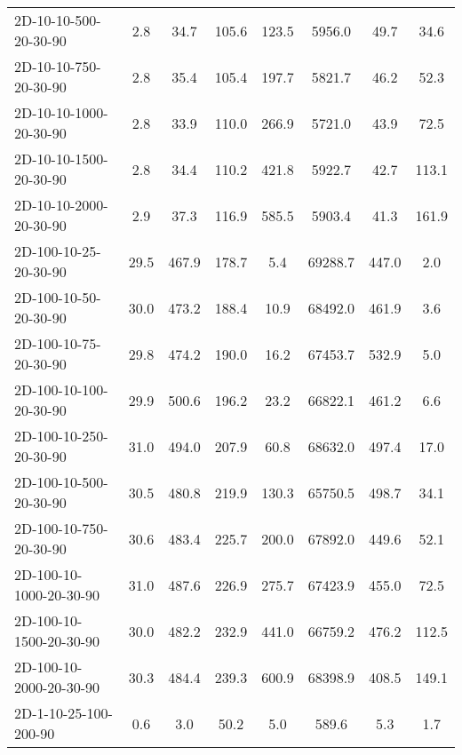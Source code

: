 \documentclass{article}
\begin{document}
\begin{table}[h]
\begin{center}
\begin{tabular}{|l||c|c|c|c|c|c|c|}
            2D-10-10-500-20-30-90         & 2.8  & 34.7      & 105.6      & 123.5       & 5956.0   & 49.7      & 34.6       \\
            2D-10-10-750-20-30-90         & 2.8  & 35.4      & 105.4      & 197.7       & 5821.7   & 46.2      & 52.3       \\
            2D-10-10-1000-20-30-90        & 2.8  & 33.9      & 110.0      & 266.9       & 5721.0   & 43.9      & 72.5       \\
            2D-10-10-1500-20-30-90        & 2.8  & 34.4      & 110.2      & 421.8       & 5922.7   & 42.7      & 113.1      \\
            2D-10-10-2000-20-30-90        & 2.9  & 37.3      & 116.9      & 585.5       & 5903.4   & 41.3      & 161.9      \\
            \hline
            2D-100-10-25-20-30-90         & 29.5 & 467.9     & 178.7      & 5.4         & 69288.7  & 447.0     & 2.0        \\
            2D-100-10-50-20-30-90         & 30.0 & 473.2     & 188.4      & 10.9        & 68492.0  & 461.9     & 3.6        \\
            2D-100-10-75-20-30-90         & 29.8 & 474.2     & 190.0      & 16.2        & 67453.7  & 532.9     & 5.0        \\
            2D-100-10-100-20-30-90        & 29.9 & 500.6     & 196.2      & 23.2        & 66822.1  & 461.2     & 6.6        \\
            2D-100-10-250-20-30-90        & 31.0 & 494.0     & 207.9      & 60.8        & 68632.0  & 497.4     & 17.0       \\
            2D-100-10-500-20-30-90        & 30.5 & 480.8     & 219.9      & 130.3       & 65750.5  & 498.7     & 34.1       \\
            2D-100-10-750-20-30-90        & 30.6 & 483.4     & 225.7      & 200.0       & 67892.0  & 449.6     & 52.1       \\
            2D-100-10-1000-20-30-90       & 31.0 & 487.6     & 226.9      & 275.7       & 67423.9  & 455.0     & 72.5       \\
            2D-100-10-1500-20-30-90       & 30.0 & 482.2     & 232.9      & 441.0       & 66759.2  & 476.2     & 112.5      \\
            2D-100-10-2000-20-30-90       & 30.3 & 484.4     & 239.3      & 600.9       & 68398.9  & 408.5     & 149.1      \\
            \hline
            2D-1-10-25-100-200-90         & 0.6  & 3.0       & 50.2       & 5.0         & 589.6    & 5.3       & 1.7        \\

\end{tabular}
\end{center}
\end{table}
\end{document}
